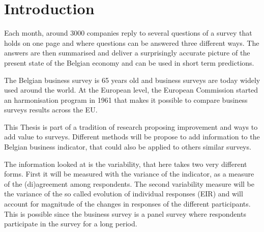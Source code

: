 \documentclass[12pt,a4paper,oneside]{book}
\begin{document}
\tableofcontents

\newpage
\setcounter{page}{0}


\chapter{Introduction}






Each month, around 3000 companies reply to several questions of a survey that holds on one page and where questions can be answered three different ways.
The answers are then summarised and deliver a surprisingly accurate picture of the present state of the Belgian economy and can be used in short term predictions.

The Belgian business survey is 65 years old and business surveys are today widely used around the world. 
At the European level, the European Commission started an harmonisation program in 1961 that makes it possible to compare business surveys results across the EU.

This Thesis is part of a tradition of research proposing improvement and ways to add value to surveys. Different methods will be propose to add information to the Belgian business indicator, that could also be applied to others similar surveys.


The information looked at is the variability, that here takes two very different forms. 
First it will be measured with the variance of the indicator, as a measure of the (di)agreement among respondents.
The second variability measure will be the variance of the so called evolution of individual responses (EIR) and will account for magnitude of the changes in responses of the different participants. This is possible since the business survey is a panel survey where respondents participate in the survey for a long period.
\end{document}
